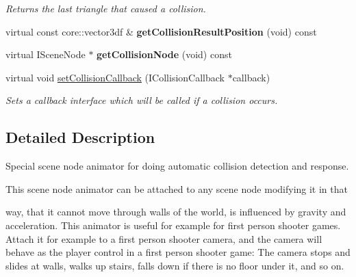 \begin{DoxyCompactItemize}
\begin{DoxyCompactList}\small\item\em Returns the last triangle that caused a collision. \end{DoxyCompactList}\item 
\hypertarget{classirr_1_1scene_1_1_c_scene_node_animator_collision_response_ae2cc2f559004aaf5c64b8a33413fc2da}{virtual const core\-::vector3df \& {\bfseries get\-Collision\-Result\-Position} (void) const }\label{classirr_1_1scene_1_1_c_scene_node_animator_collision_response_ae2cc2f559004aaf5c64b8a33413fc2da}

\item 
\hypertarget{classirr_1_1scene_1_1_c_scene_node_animator_collision_response_a6501ff6c98f8ce0c91679d0ff2e8758c}{virtual I\-Scene\-Node $\ast$ {\bfseries get\-Collision\-Node} (void) const }\label{classirr_1_1scene_1_1_c_scene_node_animator_collision_response_a6501ff6c98f8ce0c91679d0ff2e8758c}

\item 
virtual void \hyperlink{classirr_1_1scene_1_1_c_scene_node_animator_collision_response_a21ae95443b30da766bc915654357fbf1}{set\-Collision\-Callback} (I\-Collision\-Callback $\ast$callback)
\begin{DoxyCompactList}\small\item\em Sets a callback interface which will be called if a collision occurs. \end{DoxyCompactList}\end{DoxyCompactItemize}


\subsection{Detailed Description}
Special scene node animator for doing automatic collision detection and response. 

\begin{DoxyVerb}This scene node animator can be attached to any scene node modifying it in that
\end{DoxyVerb}
 way, that it cannot move through walls of the world, is influenced by gravity and acceleration. This animator is useful for example for first person shooter games. Attach it for example to a first person shooter camera, and the camera will behave as the player control in a first person shooter game\-: The camera stops and slides at walls, walks up stairs, falls down if there is no floor under it, and so on. 

